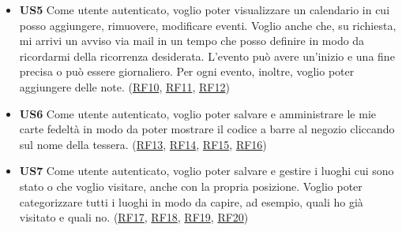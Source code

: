 \documentclass[a4paper,12pt]{article}
\begin{document}
\begin{itemize}
\begin{center}
\end{center}

\newpage

\item \textbf {US5}  Come utente autenticato, voglio poter visualizzare un calendario in cui posso aggiungere, rimuovere, modificare eventi. Voglio anche che, su richiesta, mi arrivi un avviso via mail in un tempo che posso definire in modo da ricordarmi della ricorrenza desiderata. L'evento può avere un'inizio e una fine precisa o può essere giornaliero. Per ogni evento, inoltre, voglio poter aggiungere delle note. (\hyperlink{RF10}{RF10}, \hyperlink{RF11}{RF11}, \hyperlink{RF12}{RF12})

\begin{center}
\end{center}

\item \textbf {US6} Come utente autenticato, voglio poter salvare e amministrare le mie carte fedeltà in modo da poter mostrare il codice a barre al negozio cliccando sul nome della tessera. (\hyperlink{RF13}{RF13}, \hyperlink{RF14}{RF14}, \hyperlink{RF15}{RF15}, \hyperlink{RF16}{RF16})

\begin{center}
\end{center}

\item \textbf {US7} Come utente autenticato, voglio poter salvare e gestire i luoghi cui sono stato o che voglio visitare, anche con la propria posizione. Voglio poter categorizzare tutti i luoghi in modo da capire, ad esempio, quali ho già visitato e quali no. (\hyperlink{RF17}{RF17}, \hyperlink{RF18}{RF18}, \hyperlink{RF19}{RF19}, \hyperlink{RF20}{RF20})


\end{itemize}
\end{document}
